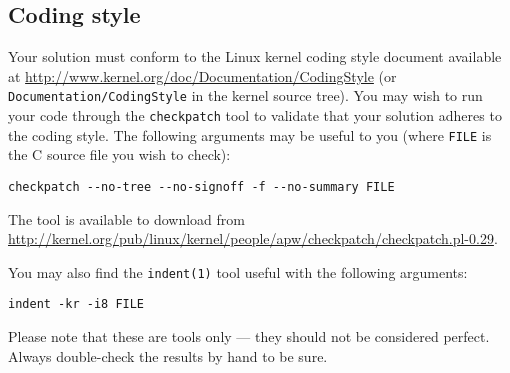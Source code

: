 \subsection*{Coding style}

Your solution must conform to the Linux kernel coding style document available
at \url{http://www.kernel.org/doc/Documentation/CodingStyle} (or
\texttt{Documentation/CodingStyle} in the kernel source tree). You may wish to
run your code through the \texttt{checkpatch} tool to validate that your
solution adheres to the coding style. The following arguments may be useful to
you (where \texttt{FILE} is the C source file you wish to check):

\begin{verbatim}
checkpatch --no-tree --no-signoff -f --no-summary FILE
\end{verbatim}

The tool is available to download from
\url{http://kernel.org/pub/linux/kernel/people/apw/checkpatch/checkpatch.pl-0.29}.

You may also find the \texttt{indent(1)} tool useful with the following arguments:

\begin{verbatim}
indent -kr -i8 FILE
\end{verbatim}

Please note that these are tools only --- they should not be considered
perfect. Always double-check the results by hand to be sure.
